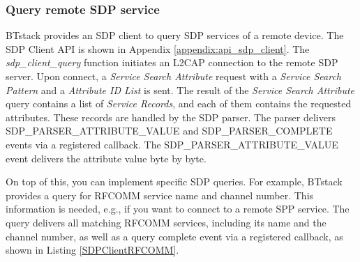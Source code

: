 \subsubsection{Query remote SDP service}

BTstack provides an SDP client to query SDP services of a remote device. The SDP Client API  is shown in Appendix \ref{appendix:api_sdp_client}. The \emph{sdp\_client\_query} function initiates an L2CAP connection to the remote SDP server. Upon connect, a \emph{Service Search Attribute} request with a \emph{Service Search Pattern} and a \emph{Attribute ID List} is sent. The result of the \emph{Service Search Attribute} query contains a list of \emph{Service Records}, and each of them contains the requested attributes. These records are handled by the SDP parser. The parser delivers SDP\_PARSER\_ATTRIBUTE\_VALUE and SDP\_PARSER\_COMPLETE events via a registered callback. The SDP\_PARSER\_ATTRIBUTE\_VALUE event delivers the attribute value byte by byte.

On top of this, you can implement specific SDP queries. For example, BTstack provides a query for RFCOMM service name and channel number. This information is needed, e.g., if you want to connect to a remote SPP service. The query delivers all matching RFCOMM services, including its name and the channel number, as well as a query complete  event via a registered callback, as shown in Listing \ref{SDPClientRFCOMM}.


